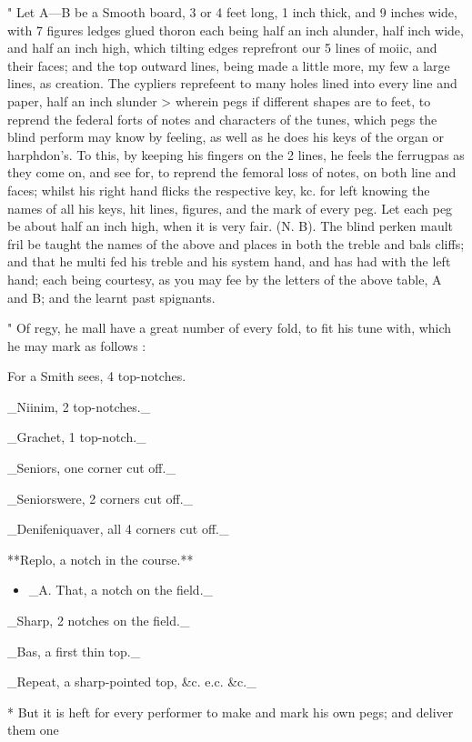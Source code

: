 \documentclass{article}
\begin{document}
" Let A—B be a Smooth board, 3 or 4 feet long, 1 inch thick, and 9 inches wide, with 7 figures ledges glued thoron each being half an inch alunder, half inch wide, and half an inch high, which tilting edges reprefront our 5 lines of moiic, and their faces; and the top outward lines, being made a little more, my few a large lines, as creation. The cypliers reprefeent to many holes lined into every line and paper, half an inch slunder > wherein pegs if different shapes are to feet, to reprend the federal forts of notes and characters of the tunes, which pegs the blind perform may know by feeling, as well as he does his keys of the organ or harphdon’s. To this, by keeping his fingers on the 2 lines, he feels the ferrugpas as they come on, and see for, to reprend the femoral loss of notes, on both line and faces; whilst his right hand flicks the respective key, kc. for left knowing the names of all his keys, hit lines, figures, and the mark of every peg. Let each peg be about half an inch high, when it is very fair. (N. B). The blind perken mault fril be taught the names of the above and places in both the treble and bals cliffs; and that he multi fed his treble and his system hand, and has had with the left hand; each being courtesy, as you may fee by the letters of the above table, A and B; and the learnt past spignants.

" Of regy, he mall have a great number of every fold, to fit his tune with, which he may mark as follows :

For a Smith sees, 4 top-notches.

\_Niinim, 2 top-notches.\_

\_Grachet, 1 top-notch.\_

\_Seniors, one corner cut off.\_

\_Seniorswere, 2 corners cut off.\_

\_Denifeniquaver, all 4 corners cut off.\_

**Replo, a notch in the course.**

\begin{itemize}
\item \_A. That, a notch on the field.\_
\end{itemize}
\_Sharp, 2 notches on the field.\_

\_Bas, a first thin top.\_

\_Repeat, a sharp-pointed top, \&c. e.c. \&c.\_

* But it is heft for every performer to make and mark his own pegs; and deliver them one
\end{document}
